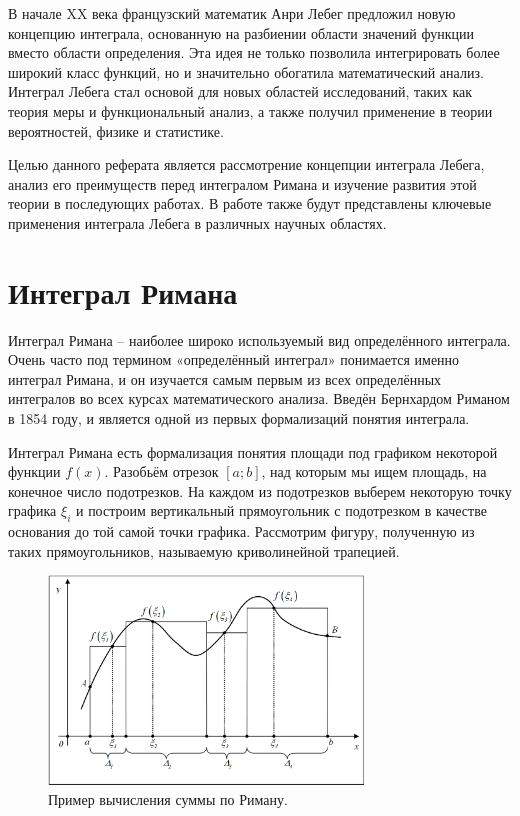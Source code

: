 \documentclass[a4paper,14pt]{extarticle}
\begin{document}
В начале XX века французский математик Анри Лебег предложил новую концепцию интеграла, основанную на разбиении области значений функции вместо области определения. Эта идея не только позволила интегрировать более широкий класс функций, но и значительно обогатила математический анализ. Интеграл Лебега стал основой для новых областей исследований, таких как теория меры и функциональный анализ, а также получил применение в теории вероятностей, физике и статистике.

Целью данного реферата является рассмотрение концепции интеграла Лебега, анализ его преимуществ перед интегралом Римана и изучение развития этой теории в последующих работах. В работе также будут представлены ключевые применения интеграла Лебега в различных научных областях.

\newpage
\section{Интеграл Римана}

Интеграл Римана -- наиболее широко используемый вид определённого интеграла. Очень часто под термином «определённый интеграл» понимается именно интеграл Римана, и он изучается самым первым из всех определённых интегралов во всех курсах математического анализа. Введён Бернхардом Риманом в 1854 году, и является одной из первых формализаций понятия интеграла. ~\cite{wikipedia_riemann_integral}

Интеграл Римана есть формализация понятия площади под графиком некоторой функции $f(x)$. Разобьём отрезок $[a; b]$, над которым мы ищем площадь, на конечное число подотрезков. На каждом из подотрезков выберем некоторую точку графика $\xi_i$ и построим вертикальный прямоугольник с подотрезком в качестве основания до той самой точки графика. Рассмотрим фигуру, полученную из таких прямоугольников, называемую криволинейной трапецией.

\begin{figure}[h]
    \centering
    \includegraphics[width=0.75\textwidth]{images/riemann_integral.png}
    \caption{Пример вычисления суммы по Риману.}
\end{figure}
\end{document}

